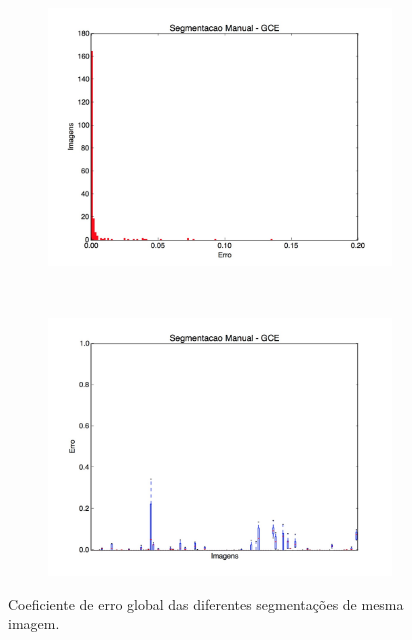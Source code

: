 \begin{figure}[h]
  \centering
  \begin{subfigure}[b]{0.5\textwidth}
    \includegraphics[width=\textwidth]{imgs/manual_gce}
  \end{subfigure}%
  ~
  \begin{subfigure}[b]{0.5\textwidth}
    \includegraphics[width=\textwidth]{imgs/manual_dist_gce}
  \end{subfigure}%
  \caption{Coeficiente de erro global das diferentes segmentações de mesma imagem.}
  \label{fig:manual_gce}
\end{figure}

